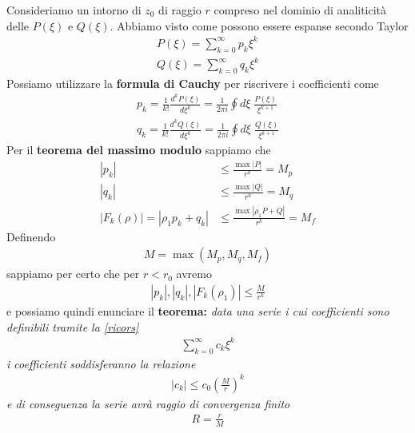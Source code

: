 Consideriamo un intorno di $z_0$ di raggio $r$ compreso nel dominio di analiticità delle $P(\xi)$ e $Q(\xi)$.
Abbiamo visto come possono essere espanse secondo Taylor
\begin{align}
	P(\xi) = \sum_{k=0}^{\infty} p_k \xi^k \\
	Q(\xi) = \sum_{k=0}^{\infty} q_k \xi^k
\end{align}
Possiamo utilizzare la \textbf{formula di Cauchy} per riscrivere i coefficienti come
\begin{align}
	p_k = \frac{1}{k!} \frac{d^k P(\xi)}{d\xi^k} = \frac{1}{2\pi i} \oint d\xi \; \frac{P(\xi)}{\xi^{k+1}}\\
	q_k = \frac{1}{k!} \frac{d^k Q(\xi)}{d\xi^k} = \frac{1}{2\pi i} \oint d\xi \; \frac{Q(\xi)}{\xi^{k+1}}
\end{align}
Per il \textbf{teorema del massimo modulo} sappiamo che
\begin{align}
	|p_k| &\leq \frac{\max |P|}{r^k} = M_p\\
	|q_k| &\leq \frac{\max |Q|}{r^k} = M_q\\
	|F_k(\rho)| =  | \rho_1 p_k + q_k| &\leq \frac{\max |\rho_1 P + Q|}{r^k} = M_f
\end{align}
Definendo 
\begin{align}
	M = \max (M_p, M_q, M_f)
\end{align}
sappiamo per certo che per $r<r_0$ avremo
\begin{align}
	|p_k|,|q_k|,|F_k(\rho_1)| \leq \frac{M}{r^k}
\end{align}
e possiamo quindi enunciare il \textbf{teorema:} \textit{data una serie i cui coefficienti sono definibili tramite la \ref{ricors}
	\begin{align}
		\sum_{k=0}^{\infty} c_k \xi^k
\end{align}
i coefficienti soddisferanno la relazione
\begin{align}
	|c_k| \leq c_0 \left(\frac{M}{r}\right)^k
\end{align}
e di conseguenza la serie avrà raggio di convergenza finito
\begin{align}
	R = \frac{r}{M}
\end{align}
}

